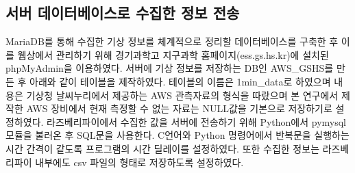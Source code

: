 \subsection{서버 데이터베이스로 수집한 정보 전송}
MariaDB를 통해 수집한 기상 정보를 체계적으로 정리할 데이터베이스를 구축한 후 이를 웹상에서 관리하기 위해 경기과학고 지구과학 홈페이지(ess.gs.hs.kr)에 설치된 phpMyAdmin을 이용하였다. 서버에 기상 정보를 저장하는 DB인 AWS\_GSHS를 만든 후 아래와 같이 테이블을 제작하였다. 테이블의 이름은 1min\_data로 하였으며 내용은 기상청 날씨누리에서 제공하는 AWS 관측자료의 형식을 따랐으며 본 연구에서 제작한 AWS 장비에서 현재 측정할 수 없는 자료는 NULL값을 기본으로 저장하기로 설정하였다.
라즈베리파이에서 수집한 값을 서버에 전송하기 위해 Python에서 pymysql 모듈을 불러온 후 SQL문을 사용한다. C언어와 Python 명령어에서 반복문을 실행하는 시간 간격이 같도록 프로그램의 시간 딜레이를 설정하였다. 또한 수집한 정보는 라즈베리파이 내부에도 csv 파일의 형태로 저장하도록 설정하였다.

